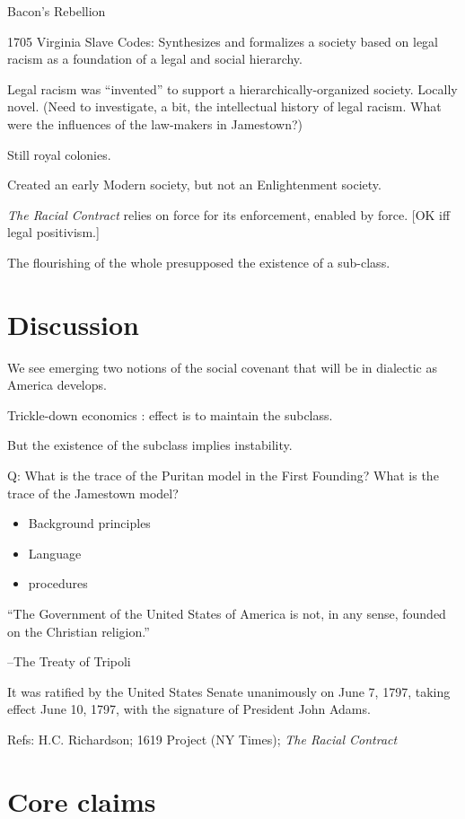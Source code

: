 \documentclass[
]{book}
\providecommand{\tightlist}{%
  \setlength{\itemsep}{0pt}\setlength{\parskip}{0pt}}
\begin{document}
Bacon's Rebellion

1705 Virginia Slave Codes: Synthesizes and formalizes a society based on legal racism as a foundation of a legal and social hierarchy.

Legal racism was ``invented'' to support a hierarchically-organized society. Locally novel. (Need to investigate, a bit, the intellectual history of legal racism. What were the influences of the law-makers in Jamestown?)

Still royal colonies.

Created an early Modern society, but not an Enlightenment society.

\emph{The Racial Contract} relies on force for its enforcement, enabled by force. {[}OK iff legal positivism.{]}

The flourishing of the whole presupposed the existence of a sub-class.

\hypertarget{discussion}{%
\section{Discussion}\label{discussion}}

We see emerging two notions of the social covenant that will be in dialectic as America develops.

Trickle-down economics : effect is to maintain the subclass.

But the existence of the subclass implies instability.

Q: What is the trace of the Puritan model in the First Founding? What is the trace of the Jamestown model?

\begin{itemize}
\tightlist
\item
  Background principles
\item
  Language
\item
  procedures
\end{itemize}

``The Government of the United States of America is not, in any sense, founded on the Christian religion.''

--The Treaty of Tripoli

It was ratified by the United States Senate unanimously on June 7, 1797, taking effect June 10, 1797, with the signature of President John Adams.

Refs: H.C. Richardson; 1619 Project (NY Times); \emph{The Racial Contract}

\hypertarget{core-claims}{%
\section{Core claims}\label{core-claims}}
\end{document}
